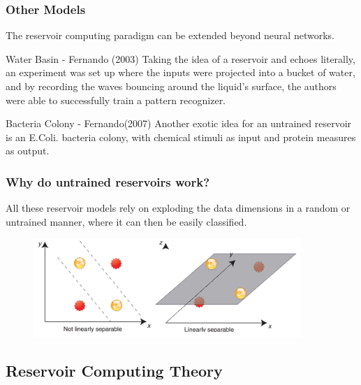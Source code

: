 \documentclass{beamer}
\begin{document}

\begin{frame}
\frametitle{Other Models}
The reservoir computing paradigm can be extended beyond neural networks.
\begin{block}{Water Basin - Fernando (2003)}
Taking the idea of a reservoir and echoes literally, an experiment was set up where the inputs were projected into a bucket of water, and by recording the waves bouncing around the liquid's surface, the authors were able to successfully train a pattern recognizer.
\end{block}

\begin{block}{Bacteria Colony - Fernando(2007)}
 Another exotic idea for an untrained reservoir is an E.Coli. bacteria colony, with chemical stimuli as input and protein measures as output.
\end{block}

\end{frame}

\begin{frame}
\frametitle{Why do untrained reservoirs work?}

All these reservoir models rely on exploding the data dimensions in a random or untrained manner, where it can then be easily classified.

\begin{figure}[!htbp]
\centering
\includegraphics[width=0.9\textwidth]{pictures/dim-explo.png}
\label{fig:dim-explo}
\end{figure}

\end{frame}


\subsection{Reservoir Computing Theory}
\end{document}
